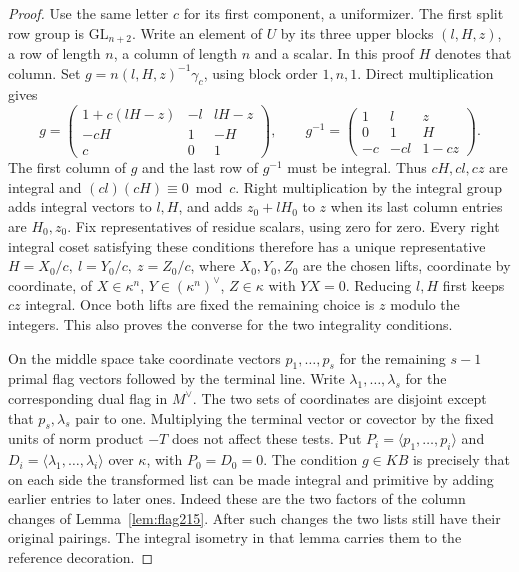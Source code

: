 \documentclass[a4paper,11pt]{article}
\theoremstyle{definition}
\theoremstyle{remark}
\numberwithin{equation}{section}
\begin{document}
\begin{proof}
Use the same letter \(c\) for its first component, a
uniformizer. The first split row group is \(\mathrm{GL}_{n+2}\).
Write an element of \(U\) by its three upper blocks
\((l,H,z)\), a row of length \(n\), a column of length \(n\)
and a scalar. In this proof \(H\) denotes that column.
Set \(g=n(l,H,z)^{-1}\gamma_c\), using block order \(1,n,1\).
Direct multiplication gives
\[
 g=
 \begin{pmatrix}
 1+c(lH-z)&-l&lH-z\\-cH&1&-H\\c&0&1
 \end{pmatrix},
 \qquad
 g^{-1}=
 \begin{pmatrix}
 1&l&z\\0&1&H\\-c&-cl&1-cz
 \end{pmatrix}.
\]
The first column of \(g\) and the last row of \(g^{-1}\) must
be integral. Thus \(cH,cl,cz\) are integral and
\((cl)(cH)\equiv0\bmod c\).
Right multiplication by the integral group adds integral
vectors to \(l,H\), and adds \(z_0+lH_0\) to \(z\) when its
last column entries are \(H_0,z_0\). Fix representatives of
residue scalars, using zero for zero. Every right integral
coset satisfying these conditions therefore has a unique
representative \(H=X_0/c,\ l=Y_0/c,\ z=Z_0/c\), where
\(X_0,Y_0,Z_0\) are the chosen lifts, coordinate by coordinate,
of \(X\in\kappa^n\), \(Y\in(\kappa^n)^\vee\),
\(Z\in\kappa\) with \(YX=0\). Reducing \(l,H\) first keeps
\(cz\) integral. Once both lifts are fixed the remaining
choice is \(z\) modulo the integers. This also proves the
converse for the two integrality conditions.

On the middle space take coordinate vectors \(p_1,\ldots,p_s\)
for the remaining \(s-1\) primal flag vectors followed by
the terminal line. Write \(\lambda_1,\ldots,\lambda_s\) for
the corresponding dual flag in \(M^\vee\). The two sets of
coordinates are disjoint except that \(p_s,\lambda_s\) pair
to one. Multiplying the terminal vector or covector by the
fixed units of norm product \(-T\) does not affect these
tests. Put \(P_i=\langle p_1,\ldots,p_i\rangle\) and
\(D_i=\langle\lambda_1,\ldots,\lambda_i\rangle\) over \(\kappa\),
with \(P_0=D_0=0\). The condition \(g\in KB\) is precisely
that on each side the transformed list can be made integral
and primitive by adding earlier entries to later ones. Indeed
these are the two factors of the column changes of
Lemma~\ref{lem:flag215}. After such changes the two lists
still have their original pairings. The integral isometry
in that lemma carries them to the reference decoration.


\end{proof}
\end{document}
